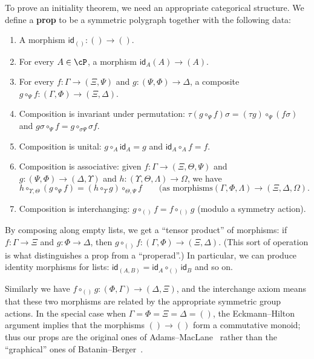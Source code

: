 \documentclass{book}
\def\idfunc{\mathsf{id}}
\begin{document}
To prove an initiality theorem, we need an appropriate categorical structure.
We define a \textbf{prop} to be a symmetric polygraph \cP together with the following data:
\begin{enumerate}
\item A morphism $\idfunc_{()}:()\to ()$.
\item For every $A\in\cP$, a morphism $\idfunc_A (A)\to (A)$.
\item For every $f:\Gamma\to (\Xi,\Psi)$ and $g:(\Psi,\Phi)\to \Delta$, a composite $g\circ_\Psi f : (\Gamma,\Phi) \to (\Xi,\Delta)$.
\item Composition is invariant under permutation: $\tau(g\circ_\Psi f)\sigma = (\tau g)\circ_\Psi (f\sigma)$ and $g\sigma \circ_\Psi f = g\circ_{\sigma \Psi} \sigma f$.
\item Composition is unital:
  $g\circ_A \idfunc_A = g$ and $\idfunc_A\circ_A f = f$.
\item Composition is associative: given $f:\Gamma\to (\Xi,\Theta,\Psi)$ and $g:(\Psi,\Phi)\to (\Delta,\Upsilon)$ and $h:(\Upsilon,\Theta,\Lambda)\to \Omega$, we have
  \[h \circ_{\Upsilon,\Theta} (g\circ_\Psi f) = (h\circ_\Upsilon g) \circ_{\Theta,\Psi} f \qquad \text{(as morphisms} (\Gamma,\Phi,\Lambda) \to (\Xi,\Delta,\Omega). \]
\item Composition is interchanging: $g\circ_{()}f = f\circ_{()}g$ (modulo a symmetry action).
\end{enumerate}
By composing along empty lists, we get a ``tensor product'' of morphisms: if $f:\Gamma\to\Xi$ and $g:\Phi\to\Delta$, then $g\circ_{()}f : (\Gamma,\Phi) \to (\Xi,\Delta)$.
(This sort of operation is what distinguishes a prop from a ``properad''.)
In particular, we can produce identity morphisms for lists: $\idfunc_{(A,B)} = \idfunc_A \circ_{()} \idfunc_B$ and so on.

Similarly we have $f\circ_{()}g : (\Phi,\Gamma) \to (\Delta,\Xi)$, and the interchange axiom means that these two morphisms are related by the appropriate symmetric group actions.
In the special case when $\Gamma=\Phi=\Xi=\Delta=()$, the Eckmann--Hilton argument implies that the morphisms $()\to ()$ form a commutative monoid; thus our props are the original ones of Adams--MacLane~\cite{maclane:natural-assoc,maclane:cat-alg} rather than the ``graphical'' ones of Batanin--Berger~\cite{bb:htapm}.
\end{document}

